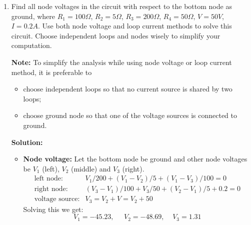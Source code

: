 \begin{enumerate}
\item Find all node voltages in the circuit with respect to the bottom node as
  ground, where $R_1=100\Omega$, $R_2=5\Omega$, $R_3=200\Omega$, $R_4=50\Omega$, 
  $V=50V$, $I=0.2A$.  Use both node voltage and loop current methods to solve 
  this circuit. Choose independent loops and nodes wisely to simplify your
  computation.  


  {\bf Note:} To simplify the analysis while using node voltage or loop current 
  method, it is preferable to
  \begin{itemize}
  \item choose independent loops so that no current source is shared by two 
    loops;
  \item choose ground node so that one of the voltage sources is connected
    to ground.
  \end{itemize}

  {\bf Solution:}
  \begin{itemize}
  \item {\bf Node voltage: }
    Let the bottom node be ground and other node voltages be 
    $V_1$ (left), $V_2$ (middle) and $V_3$ (right). 
    \[
    \begin{array}{ll}
      \mbox{left node:} & V_1/200+(V_1-V_2)/5+(V_1-V_3)/100=0\\
      \mbox{right node:} & (V_3-V_1)/100+V_3/50+(V_2-V_1)/5+0.2=0\\
      \mbox{voltage source:} & V_3=V_2+V=V_2+50 
    \end{array} 
    \]
    Solving this we get: 
    \[
    V_1=-45.23,\;\;\;\;\;V_2=-48.69,\;\;\;\;V_3=1.31 
    \]



\end{itemize}
\end{enumerate}
